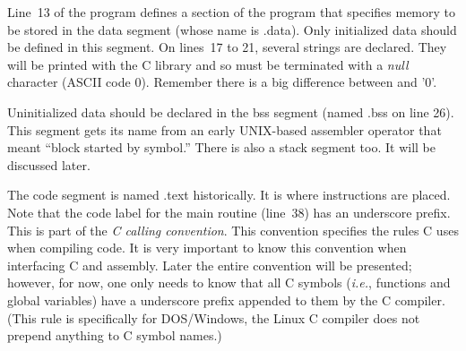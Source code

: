 Line~13 of the program defines a section of the program that specifies
memory to be stored in the data segment (whose name is {\code
.data}). Only initialized data should be defined
in this segment. On lines~17 to 21, several strings are declared. They
will be printed with the C library and so must be terminated with a
\emph{null} character (ASCII code 0).  Remember there is a big
difference between {} and {\code '0'}.

Uninitialized data should be declared in the bss segment (named {\code
.bss} on line 26). This segment gets its name from an early UNIX-based
assembler operator that meant ``block started by symbol.'' There is
also a stack segment too. It will be discussed later.

The code segment  is named {\code .text}
historically. It is where instructions are placed. Note that the code
label for the main routine (line~38) has an underscore prefix.  This
is part of the \emph{C calling convention}.  This convention specifies the rules C uses when compiling
code. It is very important to know this convention when interfacing C
and assembly. Later the entire convention will be presented; however,
for now, one only needs to know that all C symbols ({\em i.e.},
functions and global variables) have a underscore prefix appended to
them by the C compiler. (This rule is specifically for DOS/Windows,
the Linux C compiler does not prepend anything to C symbol names.)

